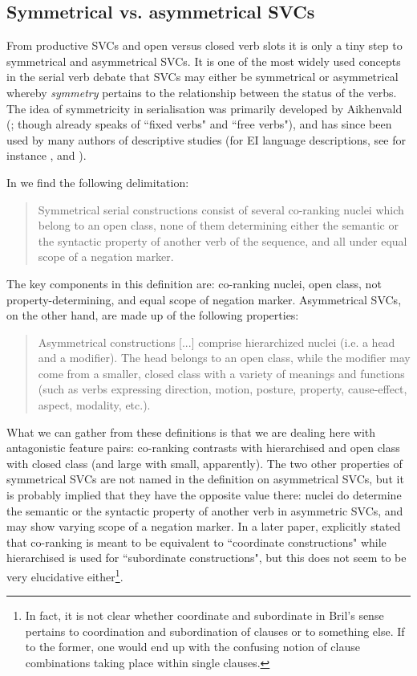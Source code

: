 \subsection{Symmetrical vs. asymmetrical SVCs}

From productive SVCs and open versus closed verb slots it is only a tiny step to symmetrical and asymmetrical SVCs. It is one of the most widely used concepts in the serial verb debate that SVCs may either be symmetrical or asymmetrical whereby \textit{symmetry} pertains to the relationship between the status of the verbs. The idea of symmetricity in serialisation was primarily developed by Aikhenvald (\citealt{aikhenvald1999serial, Aikhenvald2006}; though \citealt{sebba1987syntax} already speaks of ``fixed verbs" and ``free verbs"), and has since been used by many authors of descriptive studies (for EI language descriptions, see for instance \citealt{kratochvil2007grammar}, and \citealt{bowden2001taba}).

In \citet[5]{bril2004complex} we find the following delimitation: \begin{quote}Symmetrical serial constructions consist of several co-ranking nuclei which belong to an open class, none of them determining either the semantic or the syntactic property of another verb of the sequence, and all under equal scope of a negation marker.\end{quote}

The key components in this definition are: co-ranking nuclei, open class, not property-determining, and equal scope of negation marker. Asymmetrical SVCs, on the other hand, are made up of the following properties: \begin{quote}Asymmetrical constructions [...] comprise hierarchized nuclei (i.e. a head and a modifier). The head belongs to an open class, while the modifier may come from a smaller, closed class with a variety of meanings and functions (such as verbs expressing direction, motion, posture, property, cause-effect, aspect, modality, etc.). \citep[5]{bril2004complex}\end{quote} 

What we can gather from these definitions is that we are dealing here with antagonistic feature pairs: co-ranking contrasts with hierarchised and open class with closed class (and large with small, apparently). The two other properties of symmetrical SVCs are not named in the definition on asymmetrical SVCs, but it is probably implied that they have the opposite value there: nuclei do determine the semantic or the syntactic property of another verb in asymmetric SVCs, and may show varying scope of a negation marker. In a later paper, \citet{bril2007nexus} explicitly stated that co-ranking is meant to be equivalent to ``coordinate constructions" while hierarchised is used for ``subordinate constructions", but this does not seem to be very elucidative either\footnote{In fact, it is not clear whether coordinate and subordinate in Bril's sense pertains to coordination and subordination of clauses or to something else. If to the former, one would end up with the confusing notion of clause combinations taking place within single clauses.}.

